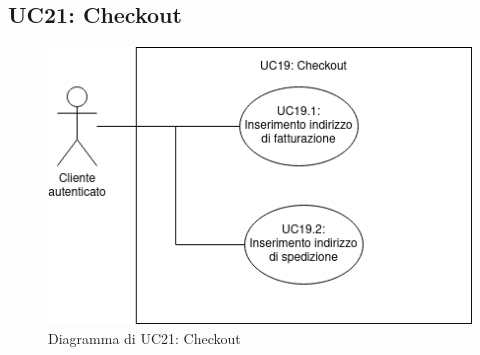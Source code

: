 \newpage
\subsection{UC21: Checkout}
\label{sec:UC21}
\begin{figure}[!ht]
    \caption{Diagramma di UC21: Checkout}
    \vspace{10px}
    \includegraphics[scale=0.5]{../../../Images/AnalisiRequisiti/UC21}
    \centering
\end{figure}
